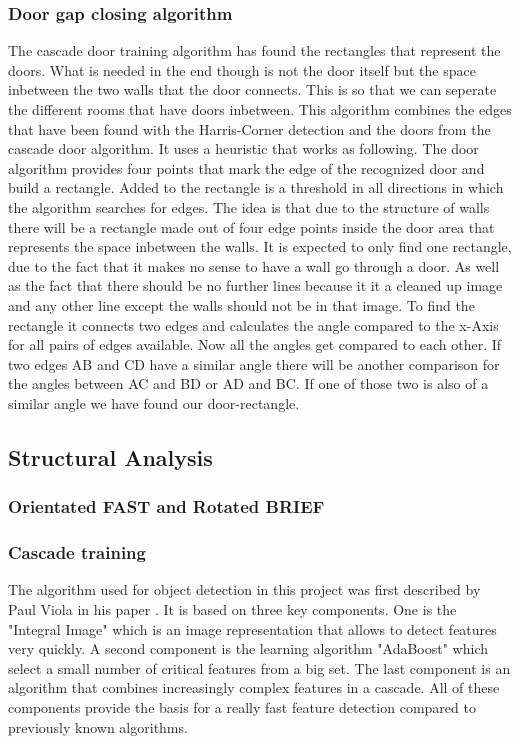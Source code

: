 \subsubsection{Door gap closing algorithm}

The cascade door training algorithm has found the rectangles that represent the doors. What is needed in the end though is not the door itself but the space inbetween the two walls that the door connects. This is so that we can seperate the different rooms that have doors inbetween.
This algorithm combines the edges that have been found with the Harris-Corner detection and the doors from the cascade door algorithm. It uses a heuristic that works as following. The door algorithm provides four points that mark the edge of the recognized door and build a rectangle.
Added to the rectangle is  a threshold in all directions in which the algorithm searches for edges. The idea is that due to the structure of walls there will be a rectangle made out of four edge points inside the door area that represents the space inbetween the walls. It is expected to only find one rectangle, due to the fact that it makes no sense to have a wall go through a door. As well as the fact that there should be no further lines because it it a cleaned up image and any other line except the walls should not be in that image.
To find the rectangle it connects two edges and calculates the angle compared to the x-Axis for all pairs of edges available. Now all the angles get compared to each other. If two edges AB and CD have a similar angle there will be another comparison for the angles between AC and BD or AD and BC. If one of those two is also of a similar angle we have found our door-rectangle.

\subsection{Structural Analysis}
\subsubsection{Orientated FAST and Rotated BRIEF}
\subsubsection{Cascade training}
The algorithm used for object detection in this project was first described by Paul Viola in his paper . It is based on three key components. One is the "Integral Image" which is an image representation that allows to detect features very quickly. A second component is the learning algorithm "AdaBoost" which select a small number of critical features from a big set. The last component is an algorithm that combines increasingly complex features in a cascade. All of these components provide the basis for a really fast feature detection compared to previously known algorithms.

